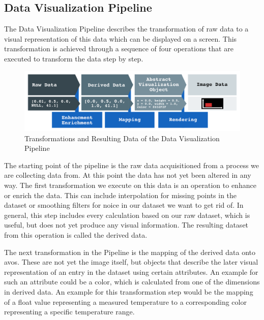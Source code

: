 \subsection{Data Visualization Pipeline}
\label{sec:fundamentals:charting:pipeline}

The Data Visualization Pipeline describes the transformation of raw data to a visual representation of this data which can be displayed on a screen. This transformation is achieved through a sequence of four operations that are executed to transform the data step by step. 

\begin{figure}[h]
    \centering
    \includegraphics[width=15cm]{resources/img/VisualizationPipeline}
    \caption{Transformations and Resulting Data of the Data Visualization Pipeline}
    \label{fig:pipeline}
\end{figure}

The starting point of the pipeline is the raw data acquisitioned from a process we are collecting data from. At this point the data has not yet been altered in any way. The first transformation we execute on this data is an operation to enhance or enrich the data. This can include interpolation for missing points in the dataset or smoothing filters for noice in our dataset we want to get rid of. In general, this step includes every calculation based on our raw dataset, which is useful, but does not yet produce any visual information.
The resulting dataset from this operation is called the derived data. 

The next transformation in the Pipeline is the mapping of the derived data onto \glspl{avo}. These are not yet the image itself, but objects that describe the later visual representation of an entry in the dataset using certain attributes. An example for such an attribute could be a color, which is calculated from one of the dimensions in derived data. An example for this transformation step would be the mapping of a float value representing a measured temperature to a corresponding color representing a specific temperature range.

